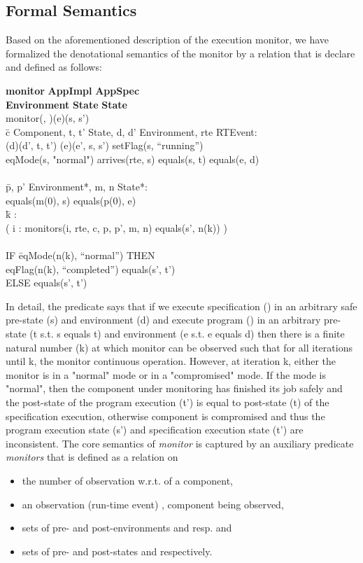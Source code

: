 \documentclass[conference]{IEEEtran}
\begin{document}
\subsection{Formal Semantics}\label{subsec:ad-semantics}
Based on the aforementioned description of the execution monitor, we have formalized the denotational semantics of the monitor by a relation  that is declare and defined as follows:

\begin{tabbing}
\textbf{monitor}   \=\textbf{AppImpl}  \textbf{AppSpec} 
\\\> \textbf{Environment}  \textbf{State}  \textbf{State}
\\monitor(, )(e)(s, s') 
\\ \=c  Component, t, t'  State, d, d'  Environment, rte  RTEvent:
\\\> \textlbrackdbl \textrbrackdbl(d)(d', t, t')  \textlbrackdbl \textrbrackdbl(e)(e', s, s') 
 setFlag(s, ``running'')  
\\\>eqMode(s, "normal")  arrives(rte, s)  equals(s, t)  equals(e, d)
\\ \=
\\\> \=p, p'  Environment*, m, n  State*: 
\\\>\>equals(m(0), s)  equals(p(0), e) 
\\\>\> \=k  :
\\\>\>\> (  i  : monitors(i, rte, c, p, p', m, n)  equals(s', n(k)) ) 
\\\>\>\>[\=( eqMode(n(k), ``normal'')  eqMode(n(k), ``compromised'')] 
\\\>\>\>IF \=eqMode(n(k), ``normal'') THEN 
\\\>\>\>\>eqFlag(n(k), ``completed'')  equals(s', t') 
\\\>\>\>ELSE  equals(s', t')
\end{tabbing}
\enlargethispage*{1cm}
In detail, the predicate says that if we execute specification () in an arbitrary safe pre-state (s) and environment (d) and execute program () in an arbitrary pre-state (t s.t. s equals t) and environment (e s.t. e equals d) then there is a finite natural number (k) at which monitor can be observed such that for all iterations until k, the monitor continuous operation. However, at iteration k, either the monitor is in a "normal" mode or in a "compromised" mode. If the mode is "normal", then the component under monitoring has finished its job safely and the post-state of the program execution (t') is equal to post-state (t) of the specification execution, otherwise component is compromised and thus the program execution state (s') and specification execution state (t') are inconsistent. 
The core semantics of \emph{monitor} is captured by an auxiliary predicate \emph{monitors} that is defined as a relation on
\begin{itemize}
\item the number of observation  w.r.t. of a component,
\item an observation (run-time event) , component  being observed,
\item sets of pre- and post-environments  and  resp. and
\item sets of pre- and post-states  and  respectively.
\end{itemize}
\end{document}
